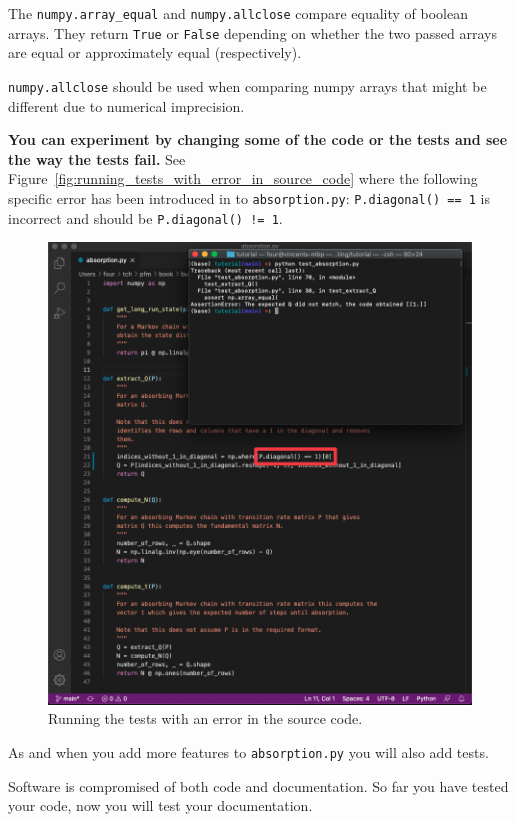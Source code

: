 \begin{note}
The \texttt{numpy.array\_equal} and \texttt{numpy.allclose} compare equality of
boolean arrays. They return \texttt{True} or \texttt{False} depending on whether the two
passed arrays are equal or approximately equal (respectively).

\texttt{numpy.allclose} should be used when comparing numpy arrays that might be
different due to numerical imprecision.
\end{note}



\textbf{You can experiment by changing some of the code or the tests and see the way
the tests fail.} See Figure~\ref{fig:running_tests_with_error_in_source_code}
where the following specific error has been introduced in to \texttt{absorption.py}:
\texttt{P.diagonal() == 1} is incorrect and should be \texttt{P.diagonal() != 1}.

\begin{figure}[htbp]
\centering

\includegraphics[width=0.750\linewidth]{./assets/running_tests_with_error_in_source_code/main.png}
\caption{Running the tests with an error in the source code.}
\label{fig:running_tests_with_errors_in_source_code}
\end{figure}


As and when you add more features to \texttt{absorption.py} you will also add tests.


Software is compromised of both code and documentation. So far you have tested
your code, now you will test your documentation.


